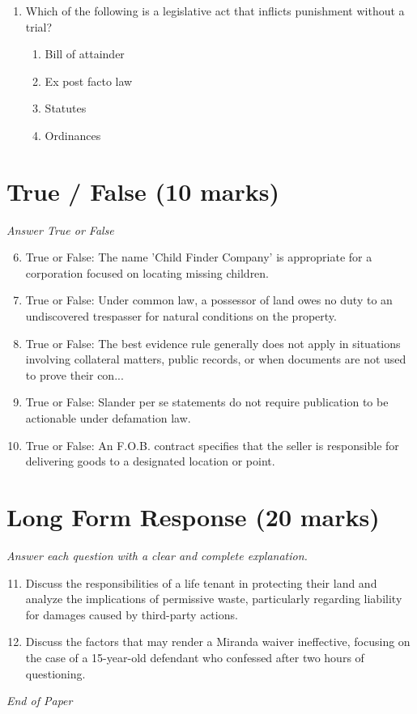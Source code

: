 \documentclass[12pt]{article}
\begin{document}
\begin{enumerate}[label=\arabic*.]
\begin{enumerate}[label=(\alph*)]
    \item interpretation of admiralty laws
    \item disputes between states and foreign citizens
    \item all of the above
\end{enumerate}
\item Which of the following is a legislative act that inflicts punishment without a trial?
\begin{enumerate}[label=(\alph*)]
    \item Bill of attainder
    \item Ex post facto law
    \item Statutes
    \item Ordinances
\end{enumerate}
\end{enumerate}

\section*{True / False (10 marks)}
\textit{Answer True or False}
\begin{enumerate}[label=\arabic*.]
\setcounter{enumi}{5}
\item True or False: The name 'Child Finder Company' is appropriate for a corporation focused on locating missing children.
\item True or False: Under common law, a possessor of land owes no duty to an undiscovered trespasser for natural conditions on the property.
\item True or False: The best evidence rule generally does not apply in situations involving collateral matters, public records, or when documents are not used to prove their con...
\item True or False: Slander per se statements do not require publication to be actionable under defamation law.
\item True or False: An F.O.B. contract specifies that the seller is responsible for delivering goods to a designated location or point.
\end{enumerate}

\section*{Long Form Response (20 marks)}
\textit{Answer each question with a clear and complete explanation.}
\begin{enumerate}[label=\arabic*.]
\setcounter{enumi}{10}
\item Discuss the responsibilities of a life tenant in protecting their land and analyze the implications of permissive waste, particularly regarding liability for damages caused by third-party actions.
\item Discuss the factors that may render a Miranda waiver ineffective, focusing on the case of a 15-year-old defendant who confessed after two hours of questioning.
\end{enumerate}

\vfill
\noindent\textit{End of Paper}
\end{document}
